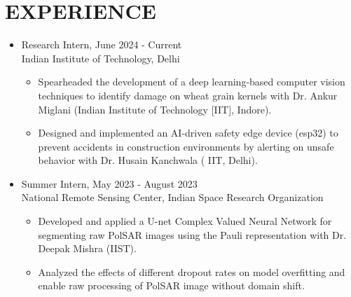 \documentclass[11pt]{article}
\begin{document}
	\section*{\bf EXPERIENCE}
	\begin{itemize}[leftmargin=*,noitemsep,topsep=0pt]
		
		\item Research Intern, \hfill June 2024 - Current \\
		Indian Institute of Technology, Delhi
		\begin{itemize}[leftmargin=*,noitemsep,topsep=0pt]
			\item Spearheaded the development of a deep learning-based computer vision techniques to identify damage on wheat grain kernels with Dr. Ankur Miglani (Indian Institute of Technology [IIT], Indore).
			\item Designed and implemented an AI-driven safety edge device (esp32) to prevent accidents in construction environments by alerting on unsafe behavior with Dr. Husain Kanchwala ( IIT, Delhi).
		\end{itemize}
		
		
		\item Summer Intern, \hfill May 2023 - August 2023\\
		National Remote Sensing Center, Indian Space Research Organization
		
		\begin{itemize}[leftmargin=*,noitemsep,topsep=0pt]			
			\item Developed and applied a U-net Complex Valued Neural Network for segmenting raw PolSAR images using the Pauli representation with Dr. Deepak Mishra (IIST).
			 \item Analyzed the effects of  different dropout rates on model overfitting and enable raw processing of PolSAR image without domain shift. 
		\end{itemize}
		

\end{itemize}
\end{document}

